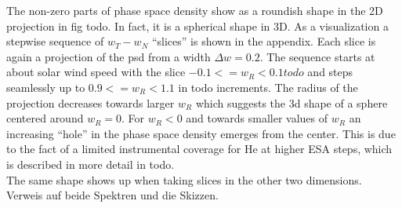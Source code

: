 The non-zero parts of phase space density show as a roundish shape in the 2D projection in fig todo. In fact, it is a spherical shape in 3D. As a visualization a stepwise sequence of $w_T - w_N$ ``slices'' is shown in the appendix. Each slice is again a projection of the psd from a width $\Delta w = 0.2$. The sequence starts at about solar wind speed with the slice $-0.1 <= w_R < 0.1 todo$ and steps seamlessly up to $0.9 <= w_R < 1.1$ in todo increments. The radius of the projection decreases towards larger $w_R$ which suggests the 3d shape of a sphere centered around $w_R = 0$.
For $w_R < 0$ and towards smaller values of $w_R$ an increasing ``hole'' in the phase space density emerges from the center. This is due to the fact of a limited instrumental coverage for He at higher ESA steps, which is described in more detail in todo.\\ The same shape shows up when taking slices in the other two dimensions. Verweis auf beide Spektren und die Skizzen.\\

